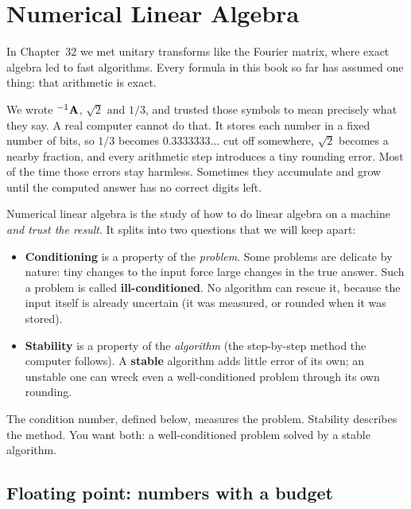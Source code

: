 \chapter{Numerical Linear Algebra}

In Chapter~32 we met unitary transforms like the Fourier matrix, where exact algebra
led to fast algorithms. Every formula in this book so far has assumed one thing:
that arithmetic is exact.

We wrote $^{-1}{\mathbf{A}}$, $\sqrt{2}$ and $1/3$, and trusted those symbols to mean
precisely what they say. A real computer cannot do that. It stores each number in a
fixed number of bits, so $1/3$ becomes $0.3333333\ldots$ cut off somewhere, $\sqrt{2}$
becomes a nearby fraction, and every arithmetic step introduces a tiny rounding error.
Most of the time those errors stay harmless. Sometimes they accumulate and grow until
the computed answer has no correct digits left.

Numerical linear algebra is the study of how to do linear algebra on a machine
\emph{and trust the result}. It splits into two questions that we will keep apart:

\begin{itemize}
  \item \textbf{Conditioning} is a property of the \emph{problem}. Some problems are
    delicate by nature: tiny changes to the input force large changes in the true
    answer. Such a problem is called \textbf{ill-conditioned}. No algorithm can rescue
    it, because the input itself is already uncertain (it was measured, or rounded
    when it was stored).
  \item \textbf{Stability} is a property of the \emph{algorithm} (the step-by-step
    method the computer follows). A \textbf{stable} algorithm adds little error of its
    own; an unstable one can wreck even a well-conditioned problem through its own
    rounding.
\end{itemize}

The condition number, defined below, measures the problem. Stability describes the
method. You want both: a well-conditioned problem solved by a stable algorithm.



\section{Floating point: numbers with a budget}


